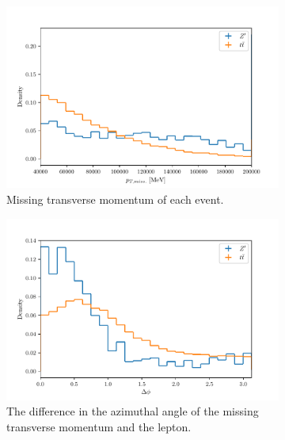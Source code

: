 \begin{figure}[H]%
  \begin{subfigure}{0.48\textwidth}%
    \centering%
    \includegraphics[width=\textwidth]{python_plots/met_et.pdf}%
    \caption{Missing transverse momentum of each event.}%
    \label{fig:5a}%
  \end{subfigure}%
  \hfill
  \begin{subfigure}{0.45\textwidth}%
    \centering%
    \includegraphics[width=\textwidth]{python_plots/del_phi.pdf}%
    \caption{The difference in the azimuthal angle of the missing transverse momentum and the lepton.}%
    \label{fig:5c}%
  \end{subfigure}%
  \hfill
  \begin{subfigure}{0.45\textwidth}%
    \centering%

\end{subfigure}
\end{figure}
